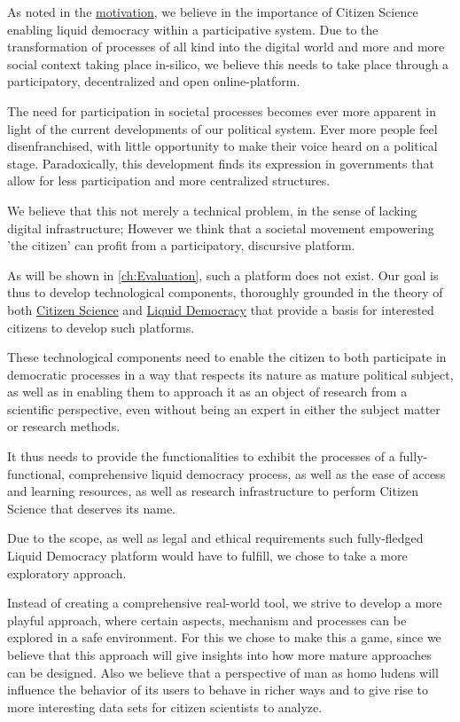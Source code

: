As noted in the \hyperref[sec:Motivation]{motivation}, we believe in the importance of Citizen Science enabling liquid democracy within a participative system. Due to the transformation of processes of all kind into the digital world and more and more social context taking place in-silico, we believe this needs to take place through a participatory, decentralized and open online-platform.

The need for participation in societal processes becomes ever more apparent in light of the current developments of our political system. Ever more people feel disenfranchised, with little opportunity to make their voice heard on a political stage. Paradoxically, this development finds its expression in governments that allow for less participation and more centralized structures.

We believe that this not merely a technical problem, in the sense of lacking digital infrastructure; However we think that a societal movement empowering 'the citizen' can profit from a participatory, discursive platform.

As will be shown in \ref{ch:Evaluation}, such a platform does not exist. Our goal is thus to develop technological components, thoroughly grounded in the theory of both \hyperref[sec:Theory_CS]{Citizen Science} and \hyperref[sec:Theory_LD]{Liquid Democracy} that provide a basis for interested citizens to develop such platforms.

These technological components need to enable the citizen to both participate in democratic processes in a way that respects its nature as mature political subject, as well as in enabling them to approach it as an object of research from a scientific perspective, even without being an expert in either the subject matter or research methods. 

It thus needs to provide the functionalities to exhibit the processes of a fully-functional, comprehensive liquid democracy process, as well as the ease of access and learning resources, as well as research infrastructure to perform Citizen Science that deserves its name.

Due to the scope, as well as legal and ethical requirements such fully-fledged Liquid Democracy platform would have to fulfill, we chose to take a more exploratory approach. 

Instead of creating a comprehensive real-world tool, we strive to develop a more playful approach, where certain aspects, mechanism and processes can be explored in a safe environment. For this we chose to make this a game, since we believe that this approach will give insights into how more mature approaches can be designed. Also we believe that a perspective of man as homo ludens will influence the behavior of its users to behave in richer ways and to give rise to more interesting data sets for citizen scientists to analyze.

